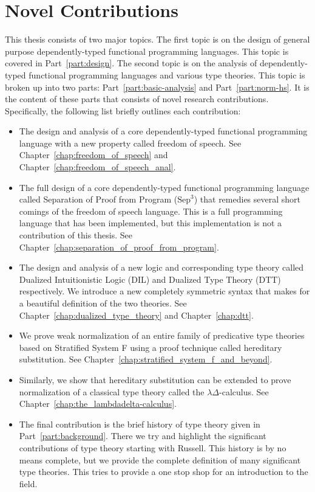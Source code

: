 \documentclass[phd,appendix,dedicationpage,ackpage,epigraphpage]{uithesis}
\newcommand{\Sep}[0]{\text{Sep}^3}
\begin{document}
\section{Novel Contributions}
\label{sec:novel_contributions}
This thesis consists of two major topics.  The first topic is on the
design of general purpose dependently-typed functional programming
languages. This topic is covered in Part~\ref{part:design}.  The
second topic is on the analysis of dependently-typed functional
programming languages and various type theories.  This topic is broken
up into two parts: Part~\ref{part:basic-analysis} and
Part~\ref{part:norm-hs}.  It is the content of these parts that
consists of novel research contributions. Specifically, the following
list briefly outlines each contribution:
\begin{itemize}
\item The design and analysis of a core dependently-typed functional
  programming language with a new property called freedom of
  speech. See Chapter~\ref{chap:freedom_of_speech} and
  Chapter~\ref{chap:freedom_of_speech_anal}.

\item The full design of a core dependently-typed functional
  programming language called Separation of Proof from Program ($\Sep$) that
  remedies several short comings of the freedom of speech language.
  This is a full programming language that has been implemented, but
  this implementation is not a contribution of this thesis.  See
  Chapter~\ref{chap:separation_of_proof_from_program}.

\item The design and analysis of a new logic and corresponding type
  theory called Dualized Intuitionistic Logic (DIL) and Dualized Type
  Theory (DTT) respectively. We introduce a new completely symmetric
  syntax that makes for a beautiful definition of the two theories.
  See Chapter~\ref{chap:dualized_type_theory} and
  Chapter~\ref{chap:dtt}.

\item We prove weak normalization of an entire family of predicative
  type theories based on Stratified System F using a proof technique
  called hereditary substitution. See
  Chapter~\ref{chap:stratified_system_f_and_beyond}.

\item Similarly, we show that hereditary substitution can be extended
  to prove normalization of a classical type theory called the
  $\lambda\Delta$-calculus. See
  Chapter~\ref{chap:the_lambdadelta-calculus}.

\item The final contribution is the brief history of type theory given
  in Part~\ref{part:background}.  There we try and highlight the
  significant contributions of type theory starting with Russell.
  This history is by no means complete, but we provide the complete
  definition of many significant type theories.  This tries to provide
  a one stop shop for an introduction to the field.
\end{itemize}
\end{document}
